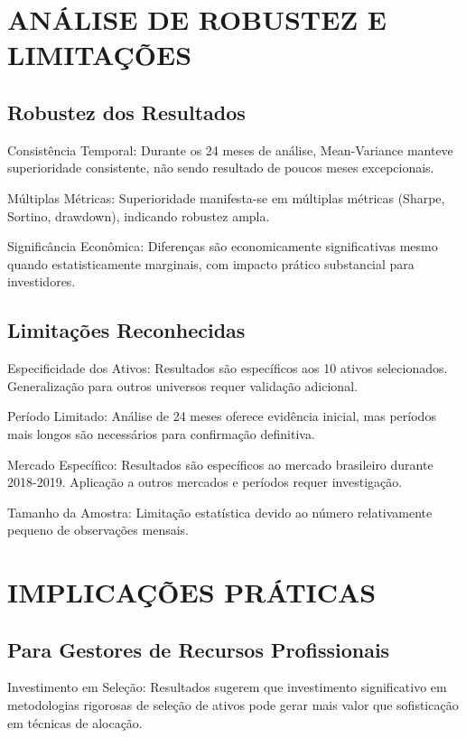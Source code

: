 \section{ANÁLISE DE ROBUSTEZ E LIMITAÇÕES}

\subsection{Robustez dos Resultados}

Consistência Temporal: Durante os 24 meses de análise, Mean-Variance manteve superioridade consistente, não sendo resultado de poucos meses excepcionais.

Múltiplas Métricas: Superioridade manifesta-se em múltiplas métricas (Sharpe, Sortino, drawdown), indicando robustez ampla.

Significância Econômica: Diferenças são economicamente significativas mesmo quando estatisticamente marginais, com impacto prático substancial para investidores.

\subsection{Limitações Reconhecidas}

Especificidade dos Ativos: Resultados são específicos aos 10 ativos selecionados. Generalização para outros universos requer validação adicional.

Período Limitado: Análise de 24 meses oferece evidência inicial, mas períodos mais longos são necessários para confirmação definitiva.

Mercado Específico: Resultados são específicos ao mercado brasileiro durante 2018-2019. Aplicação a outros mercados e períodos requer investigação.

Tamanho da Amostra: Limitação estatística devido ao número relativamente pequeno de observações mensais.

\section{IMPLICAÇÕES PRÁTICAS}

\subsection{Para Gestores de Recursos Profissionais}

Investimento em Seleção: Resultados sugerem que investimento significativo em metodologias rigorosas de seleção de ativos pode gerar mais valor que sofisticação em técnicas de alocação.

